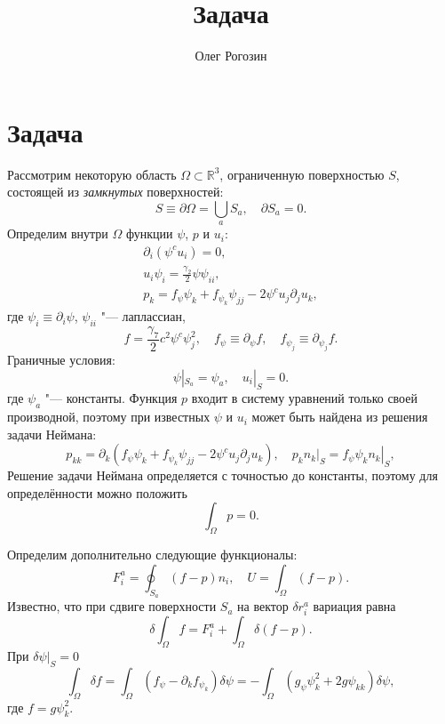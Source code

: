 \documentclass{article}
\title{Задача}
\author{Олег Рогозин}
\begin{document}
\section{Задача}

Рассмотрим некоторую область \(\Omega\subset\mathbb{R}^3\), ограниченную поверхностью \(S\),
состоящей из \emph{замкнутых} поверхностей:
\begin{equation}\label{eq:domain_boundary}
    S \equiv \partial\Omega = \bigcup_a S_a, \quad \partial{S_a} = 0.
\end{equation}
Определим внутри \(\Omega\) функции \(\psi\), \(p\) и \(u_i\):
\begin{gather}
    \partial_i \left( \psi^c u_i \right) = 0, \label{eq:p_def}\\
    u_i\psi_i = \frac{\gamma_2}2\psi\psi_{ii}, \label{eq:psi_def}\\
    p_k = f_\psi \psi_k + f_{\psi_k} \psi_{jj} - 2\psi^c u_j\partial_j u_k, \label{eq:u_i_def}
\end{gather}
где \(\psi_i\equiv\partial_i\psi\), \(\psi_{ii}\) "--- лаплассиан,
\begin{equation}\label{eq:f_def}
    f = \frac{\gamma_7}2 c^2 \psi^c\psi_j^2, \quad
    f_\psi\equiv\partial_\psi f, \quad
    f_{\psi_j}\equiv\partial_{\psi_j} f.
\end{equation}
Граничные условия:
\begin{equation}\label{eq:boundary_conditions}
    \psi|_{S_a} = \psi_a, \quad u_i|_S = 0.
\end{equation}
где \(\psi_a\) "--- константы.
Функция \(p\) входит в систему уравнений только своей производной,
поэтому при известных \(\psi\) и \(u_i\) может быть найдена из решения задачи Неймана:
\begin{equation}\label{eq:p_Neumann}
    p_{kk} = \partial_k\left( f_\psi \psi_k + f_{\psi_k} \psi_{jj} - 2\psi^c u_j\partial_j u_k \right), \quad
    p_k n_k|_S = \left. f_\psi \psi_k n_k \right|_S,
\end{equation}
Решение задачи Неймана определяется с точностью до константы, поэтому для определённости можно положить
\begin{equation}\label{eq:p_over_domain}
    \int_\Omega p = 0.
\end{equation}

Определим дополнительно следующие функционалы:
\begin{equation}\label{eq:force_energy}
    F_i^a = \oint_{S_a} (f-p) n_i, \quad U = \int_\Omega (f-p).
\end{equation}
Известно, что при сдвиге поверхности \(S_a\) на вектор \(\delta r_i^a\) вариация равна
\begin{equation}\label{eq:variation_U}
    \delta\int_\Omega f = F_i^a + \int_\Omega \delta(f-p).
\end{equation}
При \(\delta\psi|_S = 0\)
\begin{equation}\label{eq:variation_f}
    \int_\Omega \delta f = \int_\Omega \left( f_\psi - \partial_k f_{\psi_k} \right)\delta\psi =
    -\int_\Omega \left( g_\psi\psi_k^2 + 2g\psi_{kk} \right)\delta\psi,
\end{equation}
где \(f = g\psi_k^2\).
\end{document}
